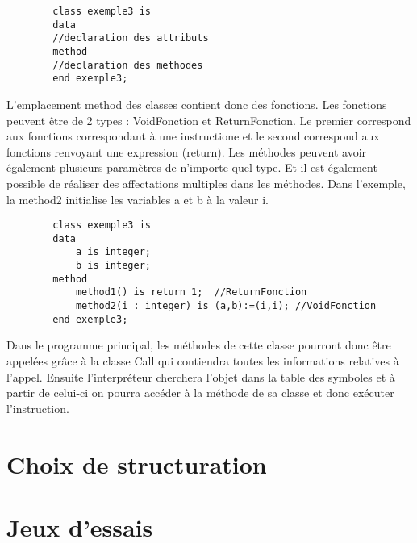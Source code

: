 \documentclass{report}
\begin{document}
	\begin{lstlisting}
		class exemple3 is
		data
		//declaration des attributs
		method
		//declaration des methodes
		end exemple3;
	\end{lstlisting}
	\par 
	L'emplacement method des classes contient donc des fonctions. Les fonctions peuvent être de 2 types : VoidFonction et ReturnFonction. Le premier correspond aux fonctions correspondant à une instructione et le second correspond aux fonctions renvoyant une expression (return). Les méthodes peuvent avoir également plusieurs paramètres de n'importe quel type. Et il est également possible de réaliser des affectations multiples dans les méthodes. Dans l'exemple, la method2 initialise les variables a et b à la valeur i.
	\begin{lstlisting}
		class exemple3 is
		data
			a is integer;
			b is integer;
		method
			method1() is return 1;	//ReturnFonction
			method2(i : integer) is (a,b):=(i,i); //VoidFonction
		end exemple3;
	\end{lstlisting}
	Dans le programme principal, les méthodes de cette classe pourront donc être appelées grâce à la classe Call qui contiendra toutes les informations relatives à l'appel. Ensuite l'interpréteur cherchera l'objet dans la table des symboles et à partir de celui-ci on pourra accéder à la méthode de sa classe et donc exécuter l'instruction.
	\section{Choix de structuration}
	\section{Jeux d'essais}
\end{document}
